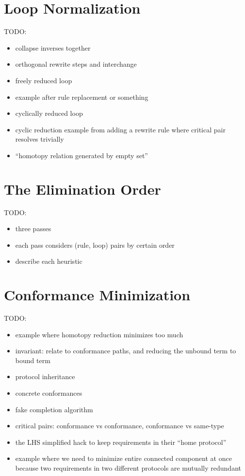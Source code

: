 \documentclass[../generics]{subfiles}
\begin{document}
\section[]{Loop Normalization}

\ifWIP
\cite{homotopyreduction}

TODO:
\begin{itemize}
\item collapse inverses together
\item orthogonal rewrite steps and interchange
\item freely reduced loop
\item example after rule replacement or something
\item cyclically reduced loop
\item cyclic reduction example from adding a rewrite rule where critical pair resolves trivially
\item ``homotopy relation generated by empty set''
\end{itemize}
\fi

\section[]{The Elimination Order}\label{elimination order}

\ifWIP
TODO:
\begin{itemize}
\item three passes
\item each pass considers (rule, loop) pairs by certain order
\item describe each heuristic
\end{itemize}
\fi

\section[]{Conformance Minimization}\label{minimal conformances}

\ifWIP


TODO:
\begin{itemize}
\item example where homotopy reduction minimizes too much
\item invariant: relate to conformance paths, and reducing the unbound term to bound term
\item protocol inheritance
\item concrete conformances
\item fake completion algorithm
\item critical pairs: conformance vs conformance, conformance vs same-type
\item the LHS simplified hack to keep requirements in their ``home protocol''
\item example where we need to minimize entire connected component at once because two requirements in two different protocols are mutually redundant
\end{itemize}
\fi
\end{document}
